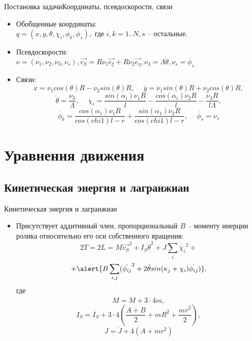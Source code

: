 \documentclass{beamer}
\begin{document}
\begin{frame}{Постановка задачи}{Координаты, псевдоскорости, связи}
  \begin{itemize}
  \item {
    Обобщенные координаты: \\
    $q = (x, y, \theta, \chi_i, \phi_k, \phi_s),$ где $i,k = 1..N, s$ -- остальные.
  }
  \item{
    Псевдоскорости:\\
    $\nu = (\nu_1, \nu_2, \nu_3, \nu_s), \vec{v_S} = R\nu_1\vec{e_\xi} + R\nu_2\vec{e_\eta}, \nu_3 = \Lambda\dot{\theta}, \nu_s = \dot{\phi_s}$
  }
  \item {
    Связи:
	$$ \dot{x} = \nu_1cos(\theta)R-\nu_2sin(\theta)R, \hspace{15pt} \dot{y} = \nu_1sin(\theta)R+\nu_2cos(\theta)R,$$
	$$\dot{\theta} = \frac{\nu_3}{\Lambda}, \hspace{15pt} \dot{\chi_i} = \frac{sin(\alpha_i)\nu_1R}{l} - \frac{cos(\alpha_i)\nu_2R}{l} - \frac{\nu_3R}{l\Lambda}, $$
	$$ \dot{\phi_k} = \frac{cos(\alpha_1)\nu_1R}{cos(chi1)l-r} + \frac{sin(\alpha_1)\nu_2R}{cos(chi1)l-r}, \hspace{15pt} \dot{\phi_s} = \nu_s $$
  }

  \end{itemize}
\end{frame}

\section{Уравнения движения}

\subsection{Кинетическая энергия и лагранжиан}

\begin{frame}{Кинетическая энергия и лагранжиан}
  \begin{itemize}
  \item {
    Присутствует аддитивный член, пропорциональный $B$ -- моменту инерции ролика относительно его оси собственного вращения:
    $$ 2T = 2L = M\vec{v_S}^2 + I_S\dot{\theta}^2 + J\sum_i\dot{\chi_i}^2 + $$
    $$ + \alert{B\sum_{i,j}(\dot{\phi_{ij}}^2 + 2\dot{\theta}sin(\kappa_j + \chi_i)\dot{\phi_{ij}})}, $$
    где
    $$ M = \mathring{M} + 3\cdot4m, $$
    $$ I_S = \mathring{I_S} + 3\cdot4(\frac{A+B}{2} + mR^2 + \frac{mr^2}{2}), $$
    $$ J = \mathring{J} + 4(A + mr^2) $$
  }

  \end{itemize}
\end{frame}
\end{document}
